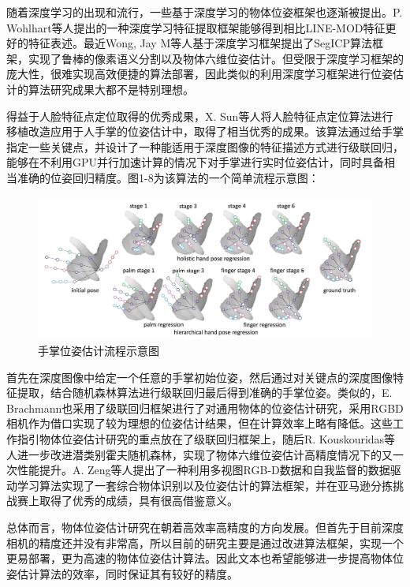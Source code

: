 随着深度学习的出现和流行，一些基于深度学习的物体位姿框架也逐渐被提出。P. Wohlhart等人提出的一种深度学习特征提取框架能够得到相比LINE-MOD特征更好的特征表述\cite{wohlhart2015learning}。最近Wong, Jay M等人基于深度学习框架提出了SegICP算法框架，实现了鲁棒的像素语义分割以及物体六维位姿估计\cite{wong2017segicp}。但受限于深度学习框架的庞大性，很难实现高效便捷的算法部署，因此类似的利用深度学习框架进行位姿估计的算法研究成果大都不是特别理想。

得益于人脸特征点定位取得的优秀成果，X. Sun等人将人脸特征点定位算法进行移植改造应用于人手掌的位姿估计中，取得了相当优秀的成果\cite{sun2015cascaded}。该算法通过给手掌指定一些关键点，并设计了一种能适用于深度图像的特征描述方式进行级联回归，能够在不利用GPU并行加速计算的情况下对手掌进行实时位姿估计，同时具备相当准确的位姿回归精度。图1-8为该算法的一个简单流程示意图：
\begin{figure}[htb]
	\centering 
	\includegraphics[width=\textwidth]{./mypic/手掌位姿估计流程示意图.jpg} 
	\caption{手掌位姿估计流程示意图} 
\end{figure}
首先在深度图像中给定一个任意的手掌初始位姿，然后通过对关键点的深度图像特征提取，结合随机森林算法进行级联回归最后得到准确的手掌位姿。类似的，E. Brachmann也采用了级联回归框架进行了对通用物体的位姿估计研究，采用RGBD相机作为借口实现了较为理想的位姿估计结果，但在计算效率上略有降低\cite{brachmann2016uncertainty}。这些工作指引物体位姿估计研究的重点放在了级联回归框架上，随后R. Kouskouridas等人进一步改进潜类别霍夫随机森林，实现了物体六维位姿估计高精度情况下的又一次性能提升\cite{kouskouridas2016latent}。A. Zeng等人提出了一种利用多视图RGB-D数据和自我监督的数据驱动学习算法实现了一套综合物体识别以及位姿估计的算法框架，并在亚马逊分拣挑战赛上取得了优秀的成绩\cite{zeng2017multi}，具有很高借鉴意义。

总体而言，物体位姿估计研究在朝着高效率高精度的方向发展。但首先于目前深度相机的精度还并没有非常高，所以目前的研究主要是通过改进算法框架，实现一个更易部署，更为高速的物体位姿估计算法。因此文本也希望能够进一步提高物体位姿估计算法的效率，同时保证其有较好的精度。

